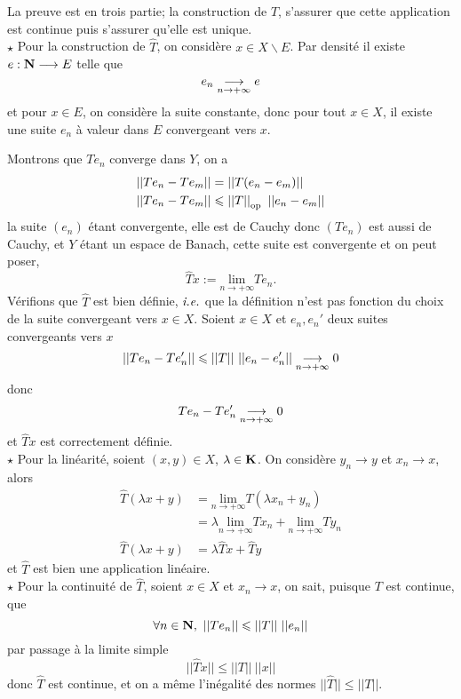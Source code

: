 \documentclass[a4paper,11pt, twoside]{article}
\begin{document}
\begin{Proof}
  La preuve est en trois partie; la construction de $\hat T$, s'assurer que cette application est continue puis s'assurer qu'elle est unique.\\

  $\star$ Pour la construction de $\hat T$, on considère $x\in X\backslash E$. Par densité il existe $e:\mathbf N\longrightarrow E$ telle que 
  $$e_n\underset{n\to+\infty}{\longrightarrow} e$$
  et pour $x\in E$, on considère la suite constante, donc pour tout $x\in X$, il existe une suite $e_n$ à valeur dans $E$ convergeant vers $x$.

  Montrons que $Te_n$ converge dans $Y$, on a 
  \begin{align*}
    ||Te_n-Te_m||&=||T(e_n-e_m)||\\
    ||Te_n-Te_m||&\leqslant \left|\left|T\right|\right|_{\mathrm{op}}\ ||e_n-e_m||
  \end{align*}
  la suite $(e_n)$ étant convergente, elle est de Cauchy donc $(Te_n)$ est aussi de Cauchy, et $Y$ étant un espace de Banach, cette suite est convergente et on peut poser, 
  $$\hat Tx:=\underset{n\to+\infty}{\mathrm{lim}}Te_n.$$
  Vérifions que $\hat T$ est bien définie, $\emph{i.e.}$ que la définition n'est pas fonction du choix de la suite convergeant vers $x\in X$. Soient $x\in X$ et $e_n,e_n'$ deux suites convergeants vers $x$
  $$||Te_n-Te_n'||\leqslant||T||\ ||e_n-e_n'||\tend0$$
  donc 
  $$Te_n-Te_n'\underset{n\to+\infty}{\longrightarrow} 0$$
  et $\hat Tx$ est correctement définie.\\

  $\star$ Pour la linéarité, soient $(x,y)\in X$, $\lambda\in\mathbf K$. On considère $y_n\longrightarrow y$ et $x_n\longrightarrow x$, alors
  \begin{align*}
    \hat T(\lambda x+y)&=\underset{n\to+\infty}{\mathrm{lim}}T(\lambda x_n+y_n)\\
    &=\lambda\underset{n\to+\infty}{\mathrm{lim}}Tx_n+\underset{n\to+\infty}{\mathrm{lim}}Ty_n\\
    \hat T(\lambda x+y)&=\lambda\hat Tx+\hat Ty
  \end{align*}
  et $\hat T$ est bien une application linéaire.\\

  $\star$ Pour la continuité de $\hat T$, soient $x\in X$ et $x_n\longrightarrow x$, on sait, puisque $T$ est continue, que 
  $$\forall n\in\N,\ ||Te_n||\leqslant ||T||\ ||e_n||$$
  par passage à la limite simple
  $$||\hat Tx||\leqslant ||T||\ ||x||$$
  donc $\hat T$ est continue, et on a même l'inégalité des normes $||\hat T||\leqslant ||T||$.\\


\end{Proof}
\end{document}
